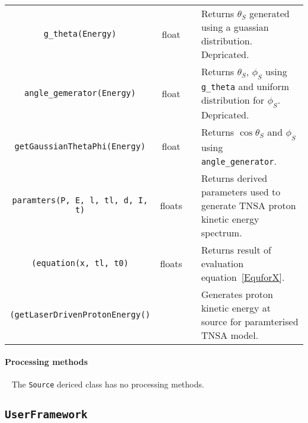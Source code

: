 \begin{table}[h]
\begin{center}
\begin{tabular}{|c|c|c|p{5cm}|}
      \texttt{g\_theta(Energy)}              & float   &               & Returns $\theta_S$ generated using a guassian distribution.
                                                                         Depricated.                                                       \\
      \texttt{angle\_gemerator(Energy)}      & float   &               & Returns $\theta_S$, $\phi_S$ using \texttt{g\_theta} and uniform
                                                                         distribution for $\phi_S$.  Depricated.                           \\
      \texttt{getGaussianThetaPhi(Energy)}   & float   &               & Returns $\cos\theta_S$ and $\phi_S$ using \texttt{angle\_generator}. \\
     \texttt{paramters(P, E, l, tl, d, I, t)}& floats  &               & Returns derived parameters used to generate TNSA proton kinetic
                                                                         energy spectrum.                                                  \\
      \texttt{(equation(x, tl, t0)}          & floats  &               & Returns result of evaluation equation~\ref{EquforX}.                   \\
      \texttt{(getLaserDrivenProtonEnergy()} &         &               & Generates proton kinetic energy at source for paramterised TNSA
                                                                         model.                                                            \\
      \hline
    \end{tabular}
  \end{center}
\end{table}

\paragraph{Processing methods} ~\newline
\noindent
The \texttt{Source} dericed class has no processing methods.

\FloatBarrier

\subsection{\texttt{UserFramework}}
\label{SubSubSect:UsrFrmwrk}

